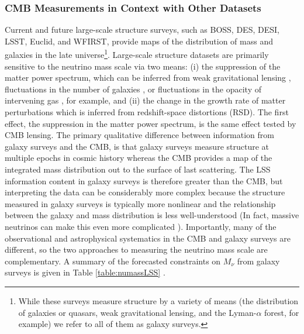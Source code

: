 \subsubsection{CMB Measurements in Context with Other Datasets}
Current and future large-scale structure surveys, such as BOSS, DES, DESI, LSST, Euclid, and WFIRST, provide maps of the distribution of mass and galaxies in the late universe\footnote{While these surveys measure structure by a variety of means (the distribution of galaxies or quasars, weak gravitational lensing, and the Lyman-$\alpha$ forest, for example) we refer to all of them as galaxy surveys.}. Large-scale structure datasets are primarily sensitive to the neutrino mass scale via two means: (i) the suppression of the matter power spectrum, which can be inferred from weak gravitational lensing \cite{Tereno:2008mm}, fluctuations in the number of galaxies \cite{Xia:2012na, Cuesta:2015iho}, or fluctuations in the opacity of intervening gas \cite{Palanque-Delabrouille:2014jca}, for example, and (ii) the change in the growth rate of matter perturbations which is inferred from redshift-space distortions (RSD)\cite{Beutler:2014yhv}. The first effect, the suppression in the matter power spectrum, is the same effect tested by CMB lensing.  The primary qualitative difference between information from galaxy surveys and the CMB, is that galaxy surveys measure structure at multiple epochs in cosmic history whereas the CMB provides a map of the integrated mass distribution out to the surface of last scattering. The LSS information content in galaxy surveys is therefore greater than the CMB, but interpreting the data can be considerably more complex because the structure measured in galaxy surveys is typically more nonlinear and the relationship between the galaxy and mass distribution is less well-understood (In fact, massive neutrinos can make this even more complicated \cite{LoVerde:2014pxa}). Importantly, many of the observational and astrophysical systematics in the CMB and galaxy surveys are different, so the two approaches to measuring the neutrino mass scale are complementary. A summary of the forecasted constraints on $M_\nu$ from galaxy surveys is given in Table \ref{table:numassLSS} \cite{Font-Ribera:2013rwa}. 
